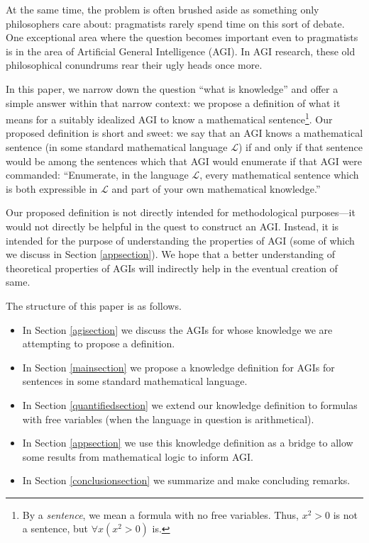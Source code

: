 \documentclass[runningheads]{llncs}
\begin{document}
At the same time, the problem is often brushed aside as something only
philosophers care about: pragmatists rarely spend time
on this sort of debate. One exceptional area where the question becomes
important even to pragmatists is in the area of Artificial General Intelligence
(AGI). In AGI research, these old philosophical conundrums rear their ugly heads
once more.

In this paper, we narrow down the question ``what is knowledge'' and offer
a simple answer within that narrow context:
we propose a definition of what it means for a suitably idealized AGI to know
a mathematical sentence\footnote{By a \emph{sentence}, we mean a formula with
no free variables. Thus, $x^2>0$ is not a sentence, but
$\forall x (x^2>0)$ is.}. Our proposed definition is short and
sweet: we say that
an AGI knows a mathematical sentence (in some standard mathematical language $\mathscr L$)
if and only if that sentence would be among the sentences which that AGI would
enumerate if that AGI were commanded:
``Enumerate, in the language $\mathscr L$, every mathematical sentence which
is both expressible in $\mathscr L$ and part of your own mathematical knowledge.''

Our proposed definition is not directly intended
for methodological purposes---it would not
directly be helpful in the quest to construct an AGI. Instead, it is intended for
the purpose of understanding the properties of AGI (some of which
we discuss in Section \ref{appsection}). We hope that a better
understanding of theoretical properties of AGIs will indirectly help in the eventual
creation of same.

The structure of this paper is as follows.
\begin{itemize}
  \item In Section \ref{agisection} we discuss the AGIs for whose knowledge we are
  attempting to propose a definition.
  \item In Section \ref{mainsection} we propose a knowledge definition for
  AGIs for sentences in some standard mathematical language.
  \item In Section \ref{quantifiedsection} we extend our knowledge definition
  to formulas with free variables (when the
  language in question is arithmetical).
  \item In Section \ref{appsection} we use this knowledge definition as a bridge
  to allow some results from mathematical logic to inform AGI.
  \item In Section \ref{conclusionsection} we summarize and make concluding remarks.
\end{itemize}
\end{document}
